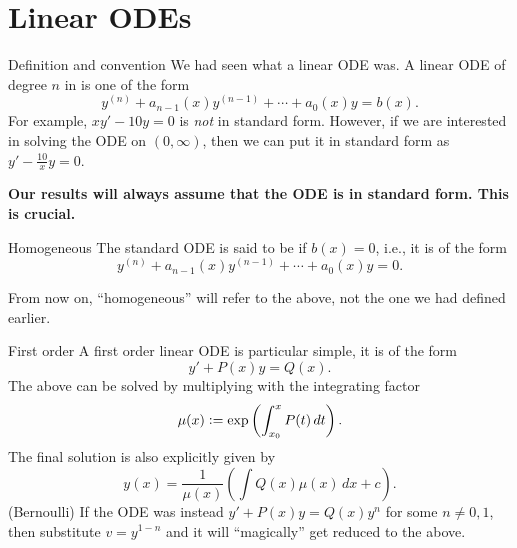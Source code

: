 \documentclass[dvipsnames, handout]{beamer}
\theoremstyle{definition}
\begin{document}
\section{Linear ODEs}

\begin{frame}{Definition and convention}
  We had seen what a linear ODE was. \pause A linear ODE of degree $n$ in  is one of the form
  \begin{equation*} 
    y^{(n)} + a_{n - 1}(x) y^{(n - 1)} + \cdots + a_{0}(x) y = b(x).
  \end{equation*} \pause
  For example, $xy' - 10y = 0$ is \emph{not} in standard form. \pause However, if we are interested in solving the ODE on $(0, \infty)$, then we can put it in standard form as \pause $y' - \frac{10}{x} y = 0$. \pause

  \begin{tcolorbox}[colback=red!5,colframe=red!75!,title=Disclaimer]
    \textbf{Our results will always assume that the ODE is in standard form. This is crucial.}
  \end{tcolorbox}
\end{frame}
\begin{frame}{Homogeneous}
  The standard ODE is said to be  if $b(x) = 0$, i.e., it is of the form
  \begin{equation*} 
    y^{(n)} + a_{n - 1}(x) y^{(n - 1)} + \cdots + a_{0}(x) y = 0.
  \end{equation*} \pause

  From now on, ``homogeneous'' will refer to the above, not the one we had defined earlier.
\end{frame}

\begin{frame}{First order}
  A first order linear ODE is particular simple, \pause it is of the form
  \begin{equation*} 
    y' + P(x) y = Q(x).
  \end{equation*}
  \pause The above can be solved by multiplying with the integrating factor
  \begin{equation*} 
    \mu(x) \vcentcolon= \exp\left(\int_{x_{0}}^{x} P(t) \,dt\right).
  \end{equation*} \pause
  The final solution is also explicitly given by
  \begin{equation*} 
    y(x) = \frac{1}{\mu(x)} \left(\int Q(x) \mu(x) \,dx + c\right).
  \end{equation*} \pause
  (Bernoulli) If the ODE was instead $y' + P(x)y = Q(x) y^{n}$ for some $n \neq 0, 1$, then substitute $v = y^{1 - n}$ and it will ``magically'' get reduced to the above.
\end{frame}
\end{document}
